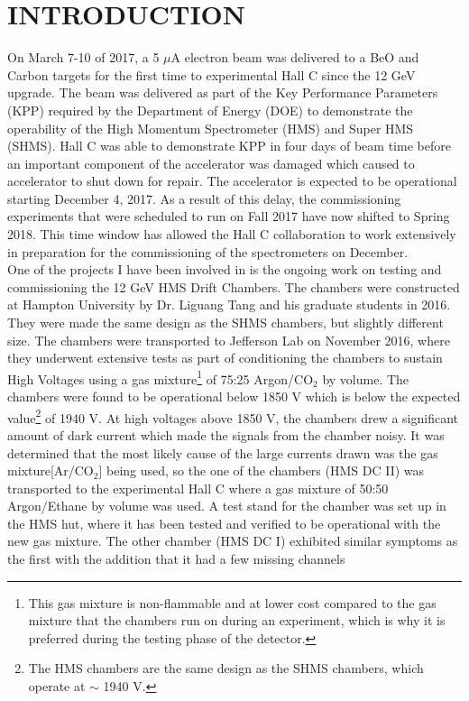 \documentclass[letterpaper, 10 pt, conference]{ieeeconf}  %
\begin{document}
\section{INTRODUCTION}
On March 7-10 of 2017, a 5 $\mu$A electron beam was delivered to a BeO and Carbon targets for the first time to experimental
Hall C since the 12 GeV upgrade. The beam was delivered as part of the Key Performance Parameters (KPP) required by the
Department of Energy (DOE) to demonstrate the operability of the High Momentum Spectrometer (HMS) and Super HMS (SHMS). 
Hall C was able to demonstrate KPP in four days of beam time before an important component of the accelerator was damaged which
caused to accelerator to shut down for repair. The accelerator is expected to be operational starting December 4, 2017. As a
result of this delay, the commissioning experiments that were scheduled to run on Fall 2017 have now shifted to Spring 2018.
This time window has allowed the Hall C collaboration to work extensively in preparation for the commissioning of the
spectrometers on December. \\
\indent One of the projects I have been involved in is the ongoing work on testing and commissioning the 12 GeV HMS Drift
Chambers. The chambers were constructed at Hampton University by Dr. Liguang Tang and his graduate students in 2016.
They were made the same design as the SHMS chambers, but slightly different size. The chambers were transported to Jefferson Lab on November 2016,
where they underwent extensive tests as part of conditioning the chambers to sustain High Voltages using a gas mixture\footnote{This gas mixture is non-flammable and
at lower cost compared to the gas mixture that the chambers run on during an experiment, which is why it is preferred during the testing phase of the detector.}
of 75:25 Argon/CO$_{2}$ by volume. The chambers were found to be operational below 1850 V which is below the expected value\footnote{The HMS chambers
are the same design as the SHMS chambers, which operate at $\sim$ 1940 V.} of 1940 V. At high voltages above 1850 V, the chambers drew a significant amount of
dark current which made the signals from the chamber noisy.
It was determined that the most likely cause of the large currents drawn was the gas mixture[Ar/CO$_{2}$] being used, so the one of the chambers (HMS DC II) was transported to the
experimental Hall C where a gas mixture of 50:50 Argon/Ethane by volume was used. A test stand for the chamber was set up in the HMS hut, where it has been tested and
verified to be operational with the new gas mixture. The other chamber (HMS DC I) exhibited similar symptoms as the first with the addition that it had a few missing channels
\end{document}
